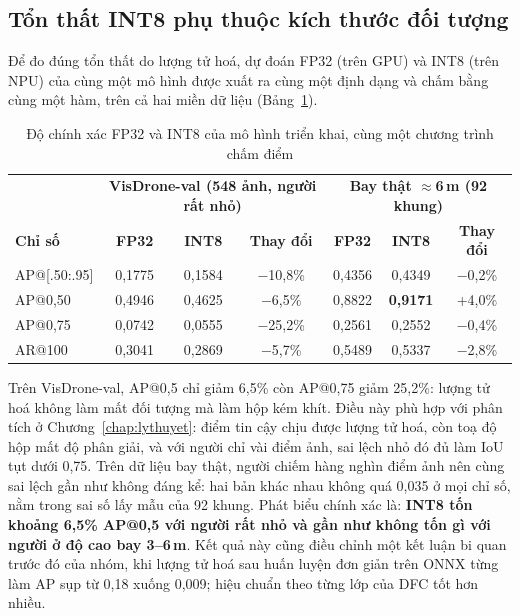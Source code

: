 \subsection{Tổn thất INT8 phụ thuộc kích thước đối tượng}

Để đo đúng tổn thất do lượng tử hoá, dự đoán FP32 (trên GPU) và INT8 (trên NPU) của cùng một mô hình được xuất ra cùng một định dạng và chấm bằng cùng một hàm, trên cả hai miền dữ liệu (Bảng~\ref{tab:int8}).

\begin{table}[H]
\centering
\caption{Độ chính xác FP32 và INT8 của mô hình triển khai, cùng một chương trình chấm điểm}
\label{tab:int8}
\small
\renewcommand{\arraystretch}{1.15}
\begin{tabular}{@{}lccc|ccc@{}}
\toprule
 & \multicolumn{3}{c|}{\textbf{VisDrone-val (548 ảnh, người rất nhỏ)}} & \multicolumn{3}{c}{\textbf{Bay thật $\approx$6\,m (92 khung)}}\\
\textbf{Chỉ số} & \textbf{FP32} & \textbf{INT8} & \textbf{Thay đổi} & \textbf{FP32} & \textbf{INT8} & \textbf{Thay đổi}\\
\midrule
AP@[.50:.95] & 0,1775 & 0,1584 & $-$10,8\% & 0,4356 & 0,4349 & $-$0,2\%\\
AP@0,50 & 0,4946 & 0,4625 & $-$6,5\% & 0,8822 & \textbf{0,9171} & +4,0\%\\
AP@0,75 & 0,0742 & 0,0555 & $-$25,2\% & 0,2561 & 0,2552 & $-$0,4\%\\
AR@100 & 0,3041 & 0,2869 & $-$5,7\% & 0,5489 & 0,5337 & $-$2,8\%\\
\bottomrule
\end{tabular}
\end{table}

Trên VisDrone-val, AP@0,5 chỉ giảm 6,5\% còn AP@0,75 giảm 25,2\%: lượng tử hoá không làm mất đối tượng mà làm hộp kém khít. Điều này phù hợp với phân tích ở Chương~\ref{chap:lythuyet}: điểm tin cậy chịu được lượng tử hoá, còn toạ độ hộp mất độ phân giải, và với người chỉ vài điểm ảnh, sai lệch nhỏ đó đủ làm IoU tụt dưới 0,75. Trên dữ liệu bay thật, người chiếm hàng nghìn điểm ảnh nên cùng sai lệch gần như không đáng kể: hai bản khác nhau không quá 0,035 ở mọi chỉ số, nằm trong sai số lấy mẫu của 92 khung. Phát biểu chính xác là: \textbf{INT8 tốn khoảng 6,5\% AP@0,5 với người rất nhỏ và gần như không tốn gì với người ở độ cao bay 3--6\,m}. Kết quả này cũng điều chỉnh một kết luận bi quan trước đó của nhóm, khi lượng tử hoá sau huấn luyện đơn giản trên ONNX từng làm AP sụp từ 0,18 xuống 0,009; hiệu chuẩn theo từng lớp của DFC tốt hơn nhiều.

